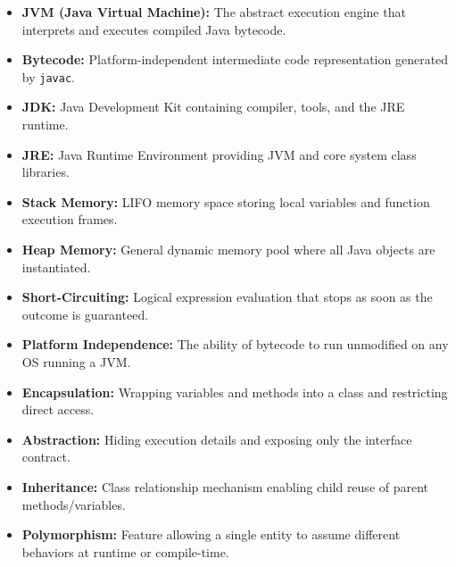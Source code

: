 \documentclass[12pt,a4paper]{article}
\begin{document}
\begin{tcolorbox}[defbox, title={\textbf{One-Line Definitions}}]
\begin{itemize}[leftmargin=*, itemsep=2pt]
  \item \textbf{JVM (Java Virtual Machine):} The abstract execution engine that interprets and executes compiled Java bytecode.
  \item \textbf{Bytecode:} Platform-independent intermediate code representation generated by \texttt{javac}.
  \item \textbf{JDK:} Java Development Kit containing compiler, tools, and the JRE runtime.
  \item \textbf{JRE:} Java Runtime Environment providing JVM and core system class libraries.
  \item \textbf{Stack Memory:} LIFO memory space storing local variables and function execution frames.
  \item \textbf{Heap Memory:} General dynamic memory pool where all Java objects are instantiated.
  \item \textbf{Short-Circuiting:} Logical expression evaluation that stops as soon as the outcome is guaranteed.
  \item \textbf{Platform Independence:} The ability of bytecode to run unmodified on any OS running a JVM.
  \item \textbf{Encapsulation:} Wrapping variables and methods into a class and restricting direct access.
  \item \textbf{Abstraction:} Hiding execution details and exposing only the interface contract.
  \item \textbf{Inheritance:} Class relationship mechanism enabling child reuse of parent methods/variables.
  \item \textbf{Polymorphism:} Feature allowing a single entity to assume different behaviors at runtime or compile-time.
\end{itemize}
\end{tcolorbox}
\end{document}
